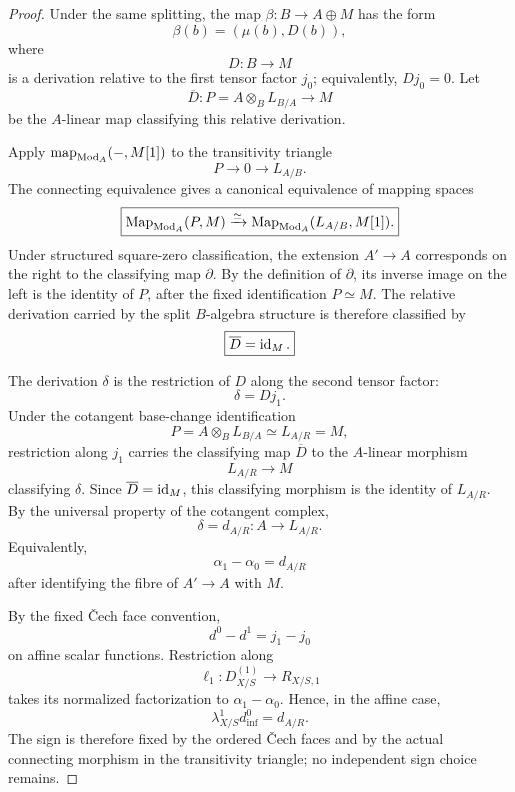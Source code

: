 \begin{proof}
Under the same splitting, the map \(\beta:B\to A\oplus M\) has the form
\[
    \beta(b)=(\mu(b),D(b)),
\]
where
\[
    D:B\longrightarrow M
\]
is a derivation relative to the first tensor factor \(j_0\); equivalently,
\(D j_0=0\).  Let
\[
    \overline D:
    P=A\otimes_BL_{B/A}
    \longrightarrow
    M
\]
be the \(A\)-linear map classifying this relative derivation.

Apply \(\operatorname{map}_{\operatorname{Mod}_A}(-,M[1])\) to the transitivity triangle
\[
    P\longrightarrow0\longrightarrow L_{A/B}.
\]
The connecting equivalence gives a canonical equivalence of mapping spaces
\[
\boxed{
    \operatorname{Map}_{\operatorname{Mod}_A}(P,M)
    \xrightarrow{\simeq}
    \operatorname{Map}_{\operatorname{Mod}_A}(L_{A/B},M[1]).
}
\]
Under structured square-zero classification, the extension \(A'\to A\)
corresponds on the right to the classifying map \(\partial\).  By the
definition of \(\partial\), its inverse image on the left is the identity of
\(P\), after the fixed identification \(P\simeq M\).  The relative derivation
carried by the split \(B\)-algebra structure is therefore classified by
\[
\boxed{
    \overline D=\operatorname{id}_M.
}
\]

The derivation \(\delta\) is the restriction of \(D\) along the second tensor
factor:
\[
    \delta=Dj_1.
\]
Under the cotangent base-change identification
\[
    P=A\otimes_BL_{B/A}\simeq L_{A/R}=M,
\]
restriction along \(j_1\) carries the classifying map \(\overline D\) to the
\(A\)-linear morphism
\[
    L_{A/R}\longrightarrow M
\]
classifying \(\delta\).  Since \(\overline D=\operatorname{id}_M\), this classifying
morphism is the identity of \(L_{A/R}\).  By the universal property of the
cotangent complex,
\[
\boxed{
    \delta=d_{A/R}:A\longrightarrow L_{A/R}.
}
\]
Equivalently,
\[
\boxed{
    \alpha_1-\alpha_0=d_{A/R}
}
\]
after identifying the fibre of \(A'\to A\) with \(M\).

By the fixed \v{C}ech face convention,
\[
    d^0-d^1
    =
    j_1-j_0
\]
on affine scalar functions.  Restriction along
\[
    \ell_1:D^{(1)}_{X/S}\longrightarrow R_{X/S,1}
\]
takes its normalized factorization to
\(\alpha_1-\alpha_0\).  Hence, in the affine case,
\[
\boxed{
    \lambda^1_{X/S}d_{\inf}^0
    =
    d_{A/R}.
}
\]
The sign is therefore fixed by the ordered \v{C}ech faces and by the actual
connecting morphism in the transitivity triangle; no independent sign choice
remains.


\end{proof}
